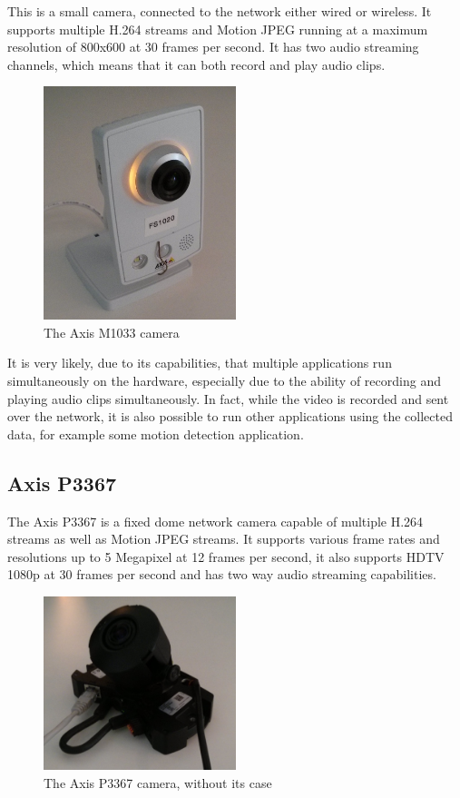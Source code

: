 \documentclass[nobiblatex]{LTHthesis}
\newcommand{\martina}[1]
  {\todo[inline,color=red!30,caption={}]{\textbf{Martina:} #1}}
\begin{document}
This is a small camera, connected to the network either wired or wireless. 
It supports multiple H.264 streams and Motion JPEG running at a maximum
resolution of 800x600 at 30 frames per second. It has two audio streaming
channels, which means that it can both record and play audio clips. 

\begin{figure}[h]
    \centering
    \includegraphics[width=0.5\textwidth]{m1033}
    \caption{The Axis M1033 camera}
    \label{fig:M1033}
\end{figure}

It is very likely, due to its capabilities, that multiple applications run
simultaneously on the hardware, especially due to the ability of recording 
and playing audio clips simultaneously. In fact, while the video is recorded
and sent over the network, it is also possible to run other applications
using the collected data, for example some motion detection application.

\subsection{Axis P3367}

The Axis P3367 is a fixed dome network camera capable of multiple H.264
streams as well as Motion JPEG streams. It supports various frame rates and
resolutions up to 5 Megapixel at 12 frames per second, it also supports 
HDTV 1080p at 30 frames per second and has two way audio streaming 
capabilities.
\martina{dome? home?}

\begin{figure}[h]
    \centering
    \includegraphics[width=0.5\textwidth]{p3367}
    \caption{The Axis P3367 camera, without its case}
    \label{fig:P3367}
\end{figure}
\end{document}
